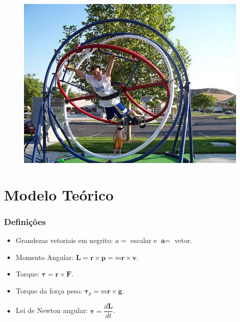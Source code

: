 \documentclass{beamer}
\begin{document}
\begin{frame}
\begin{figure}
\includegraphics[width=3.9 in]{figuras/Human-Gyroscope.jpg}
\end{figure}
\end{frame}



\section{Modelo Teórico}

\begin{frame}
\frametitle{Definições}
\begin{itemize}
\item Grandezas vetoriais em negrito: {\color{red}$a=$} escalar e {\color{red}$\textbf{a}=$} vetor.
\item Momento Angular: {\color{red}$\textbf{L} = \textbf{r} \times \textbf{p} = m\textbf{r} \times \textbf{v} $}.
\item Torque: {\color{red}$\bm{\tau} = \textbf{r} \times \textbf{F}$}.
\item Torque da força peso: {\color{red}$\bm{\tau}_p = m\textbf{r} \times \textbf{g}$}.
\item Lei de Newton angular: {\color{red}$\bm{\tau} = \dfrac{d\textbf{L}}{dt}$}.
\end{itemize}
\end{frame}
\end{document}
